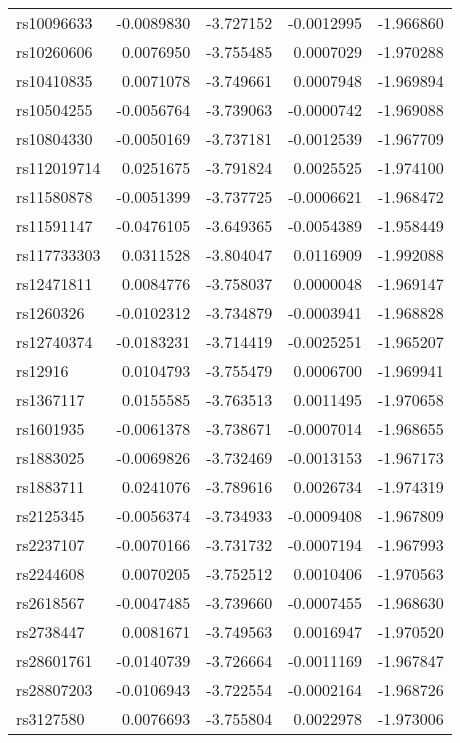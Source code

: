 \documentclass[
]{article}
\theoremstyle{plain}
\begin{document}
\begin{longtable}[t]{lrrrr}
\endfoot
\bottomrule
\endlastfoot
rs10096633 & -0.0089830 & -3.727152 & -0.0012995 & -1.966860\\
rs10260606 & 0.0076950 & -3.755485 & 0.0007029 & -1.970288\\
rs10410835 & 0.0071078 & -3.749661 & 0.0007948 & -1.969894\\
rs10504255 & -0.0056764 & -3.739063 & -0.0000742 & -1.969088\\
rs10804330 & -0.0050169 & -3.737181 & -0.0012539 & -1.967709\\
\addlinespace
rs112019714 & 0.0251675 & -3.791824 & 0.0025525 & -1.974100\\
rs11580878 & -0.0051399 & -3.737725 & -0.0006621 & -1.968472\\
rs11591147 & -0.0476105 & -3.649365 & -0.0054389 & -1.958449\\
rs117733303 & 0.0311528 & -3.804047 & 0.0116909 & -1.992088\\
rs12471811 & 0.0084776 & -3.758037 & 0.0000048 & -1.969147\\
\addlinespace
rs1260326 & -0.0102312 & -3.734879 & -0.0003941 & -1.968828\\
rs12740374 & -0.0183231 & -3.714419 & -0.0025251 & -1.965207\\
rs12916 & 0.0104793 & -3.755479 & 0.0006700 & -1.969941\\
rs1367117 & 0.0155585 & -3.763513 & 0.0011495 & -1.970658\\
rs1601935 & -0.0061378 & -3.738671 & -0.0007014 & -1.968655\\
\addlinespace
rs1883025 & -0.0069826 & -3.732469 & -0.0013153 & -1.967173\\
rs1883711 & 0.0241076 & -3.789616 & 0.0026734 & -1.974319\\
rs2125345 & -0.0056374 & -3.734933 & -0.0009408 & -1.967809\\
rs2237107 & -0.0070166 & -3.731732 & -0.0007194 & -1.967993\\
rs2244608 & 0.0070205 & -3.752512 & 0.0010406 & -1.970563\\
\addlinespace
rs2618567 & -0.0047485 & -3.739660 & -0.0007455 & -1.968630\\
rs2738447 & 0.0081671 & -3.749563 & 0.0016947 & -1.970520\\
rs28601761 & -0.0140739 & -3.726664 & -0.0011169 & -1.967847\\
rs28807203 & -0.0106943 & -3.722554 & -0.0002164 & -1.968726\\
rs3127580 & 0.0076693 & -3.755804 & 0.0022978 & -1.973006\\

\end{longtable}
\end{document}
